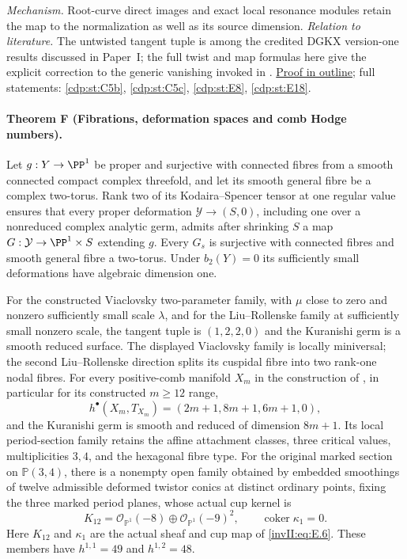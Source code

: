 \textit{Mechanism.} Root-curve direct images and exact local
resonance modules retain the map to the normalization as well as
its source dimension.
\textit{Relation to literature.} The untwisted tangent tuple is
among the credited DGKX version-one results discussed in Paper~I;
the full twist and map formulas here give the explicit correction
to the generic vanishing invoked in \cite[Theorem~2.2]{CDP2020}.
\hyperlink{outline-II-E}{Proof in outline}; full statements:
\ref{cdp:st:C5b}, \ref{cdp:st:C5c}, \ref{cdp:st:E8},
\ref{cdp:st:E18}.

\hypertarget{main-II-F}{}
\paragraph{Theorem F (Fibrations, deformation spaces and comb Hodge numbers).}
\label{series:II:F}
Let $g:Y\to\PP^1$ be proper and surjective with connected fibres
from a smooth connected compact complex threefold, and let its
smooth general fibre be a complex two-torus. Rank two of its
Kodaira--Spencer tensor at one regular value ensures that every
proper deformation $\mathcal Y\to(S,0)$, including one over a
nonreduced complex analytic germ, admits after shrinking $S$ a
map $G:\mathcal Y\to\PP^1\times S$ extending $g$. Every $G_s$
is surjective with connected fibres and smooth general fibre a
two-torus. Under $b_2(Y)=0$ its sufficiently small deformations
have algebraic dimension one.

For the constructed Viaclovsky two-parameter family, with
$\mu$ close to zero and nonzero sufficiently small scale
$\lambda$, and for the Liu--Rollenske family at sufficiently
small nonzero scale, the tangent tuple is $(1,2,2,0)$ and the
Kuranishi germ is a smooth reduced surface. The displayed
Viaclovsky family is locally miniversal; the second
Liu--Rollenske direction splits its cuspidal fibre into two
rank-one nodal fibres. For every positive-comb manifold $X_m$
in the construction of \cite{Viaclovsky2026Combs}, in particular
for its constructed $m\ge12$ range,
\[
 h^\bullet(X_m,T_{X_m})=(2m+1,8m+1,6m+1,0),
\]
and the Kuranishi germ is smooth and reduced of dimension $8m+1$.
Its local period-section family retains the affine attachment
classes, three critical values, multiplicities $3,4$, and the
hexagonal fibre type.
For the original marked section on $\mathbb P(3,4)$, there is a
nonempty open family obtained by embedded smoothings of twelve
admissible deformed twistor conics at distinct ordinary points,
fixing the three marked period planes, whose actual cup kernel is
\[
 K_{12}=\mathcal O_{\mathbb P^1}(-8)
       \oplus\mathcal O_{\mathbb P^1}(-9)^2,
 \qquad \operatorname{coker}\kappa_1=0.
\]
Here $K_{12}$ and $\kappa_1$ are the actual sheaf and cup map of
\eqref{invII:eq:E.6}. These members have
$h^{1,1}=49$ and $h^{1,2}=48$.

